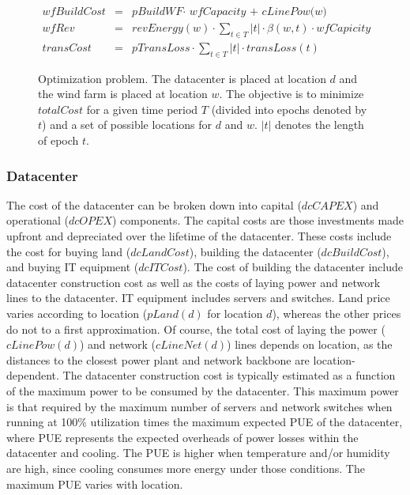 \begin{figure}
\begin{scriptsize}
\begin{eqnarray}
  \textit{wfBuildCost}&=& \textit{pBuildWF} \cdot \textit{ wfCapacity + cLinePow(w)} \\
  \textit{wfRev}&=& \textit{revEnergy}(w) \cdot  \sum_{t \in T}{ |t| \cdot
                    \beta(w,t) \cdot  \textit{wfCapicity} } \\
  \textit{transCost}&=& \textit{pTransLoss} \cdot \sum_{t \in T}{ |t| \cdot  \textit{transLoss}(t)} %
\end{eqnarray}
\end{scriptsize}
\caption{Optimization problem.  The datacenter is placed at location
  $d$ and the wind farm is placed at location $w$.  The objective is to minimize $totalCost$ for a given time period $T$ (divided into epochs denoted by $t$) and a set of possible locations for $d$ and $w$.  $|t|$ denotes the length of epoch $t$.}
\label{fig:optimization}
\vspace{-0.2in}
\end{figure}




\subsubsection{Datacenter} The cost of the datacenter can be broken down into capital ($dcCAPEX$) and operational ($dcOPEX$) components.  The capital costs are those investments made upfront and depreciated over the lifetime of the datacenter.  These costs include the cost for buying land ($dcLandCost$), building the datacenter ($dcBuildCost$), and buying IT equipment ($dcITCost$).  The cost of building the datacenter include datacenter construction cost as well as the costs of laying power and network lines to the datacenter.  IT equipment includes servers and switches.  Land price varies according to location ($pLand(d)$ for location $d$), whereas the other prices do not to a first approximation.  Of course, the total cost of laying the power ($cLinePow(d)$) and network ($cLineNet(d)$) lines depends on location, as the distances to the closest power plant and network backbone are location-dependent.  The datacenter construction cost is typically estimated as a function of the maximum power to be consumed by the datacenter.  This maximum power is that required by the maximum number of servers and network switches when running at 100\% utilization times the maximum expected PUE of the datacenter, where PUE represents the expected overheads of power losses within the datacenter and cooling.
The PUE is higher when temperature and/or humidity are high, since cooling consumes more energy under those conditions.  The maximum PUE varies with location.

